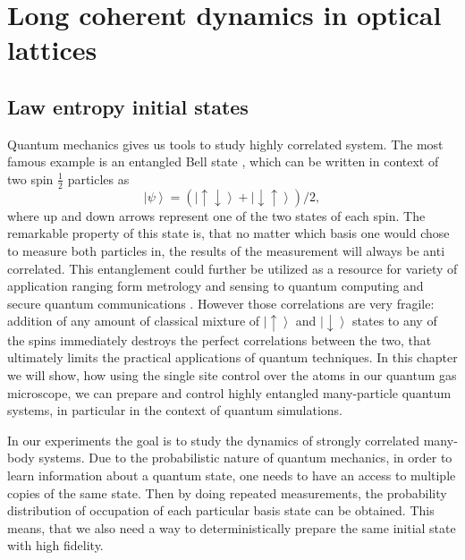 \chapter{Long coherent dynamics in optical lattices}

\section{Law entropy initial states}
Quantum mechanics gives us tools to study highly correlated system. The most famous example is an entangled Bell state \cite{something}, which can be written in context of two spin $\frac{1}{2}$ particles as 
\begin{equation}
\left| \psi \right>=(\left| \uparrow \downarrow \right>+ \left| \downarrow \uparrow \right>)/2,
\end{equation}
where up and down arrows represent one of the two states of each spin. The remarkable property of this state is, that no matter which basis one would chose to measure both particles in, the results of the measurement will always be anti correlated. This entanglement could further be utilized as a resource for variety of application ranging form metrology and sensing \cite{sombody} to quantum computing \cite{Chuang book} and secure quantum communications \cite{something}. However those correlations are very fragile: addition of any amount of classical mixture of $\left| \uparrow \right>$ and $\left| \downarrow \right>$ states to any of the spins immediately destroys the perfect correlations between the two, that ultimately limits the practical applications of quantum techniques. In this chapter we will show, how using the single site control over the atoms in our quantum gas microscope, we can prepare and control highly entangled many-particle quantum systems, in particular in the context of quantum simulations. 

In our experiments the goal is to study the dynamics of strongly correlated many-body systems. Due to the probabilistic nature of quantum mechanics, in order to learn information about a quantum state, one needs to have an access to multiple copies of the same state. Then by doing repeated measurements, the probability distribution of occupation of each particular basis state can be obtained. This means, that we also need a way to deterministically prepare the same initial state with high fidelity. 

